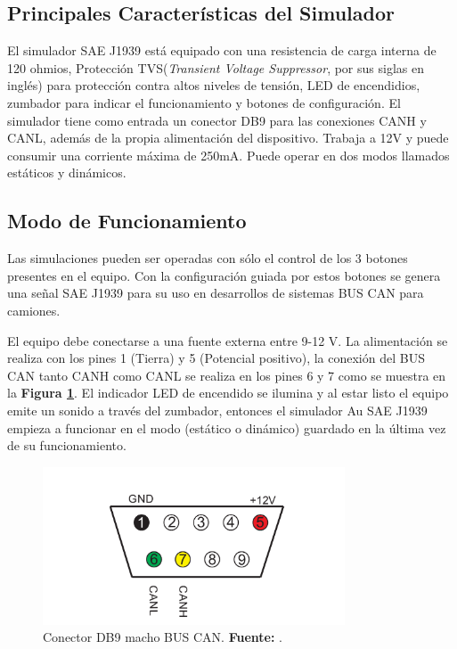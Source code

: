 \subsection {Principales Características del Simulador}
El simulador SAE J1939  está equipado con una resistencia de carga interna de 120 ohmios, Protección TVS(\textit{Transient Voltage Suppressor}, por sus siglas en inglés) para protección contra altos niveles de tensión, LED de encendidios, zumbador para indicar el funcionamiento y botones de configuración. El simulador tiene como entrada un conector DB9  para las conexiones CANH y CANL, además de la propia alimentación del dispositivo. Trabaja a 12V y puede consumir una corriente máxima de 250mA. Puede operar en dos modos llamados estáticos y dinámicos. 


\subsection{Modo de Funcionamiento}

Las simulaciones pueden ser operadas con sólo el control de los 3 botones presentes en el equipo. Con la configuración guiada por estos botones se genera una señal SAE J1939 para su uso en desarrollos de sistemas BUS CAN para camiones.

El equipo debe conectarse a una fuente externa entre 9-12 V. La alimentación se realiza con los pines 1 (Tierra) y 5 (Potencial positivo), la conexión del BUS CAN tanto CANH como CANL se realiza en los pines 6 y 7 como se muestra en la \textbf{Figura \ref{DB9}}.  El indicador LED de encendido se ilumina y al estar listo el equipo emite un sonido a través del zumbador, entonces el simulador Au SAE J1939 empieza a funcionar en el modo (estático o dinámico) guardado en la última vez de su funcionamiento.

\begin{figure}[H]
	\centering
		\includegraphics[width=0.8\textwidth]{./Cap6imagen/SimDb9.pdf}
	\caption[Conector DB9 macho BUS CAN.]{Conector DB9 macho BUS CAN.\textbf{ Fuente:} \cite{UserM}.}
	\label{DB9} %
\end{figure}

